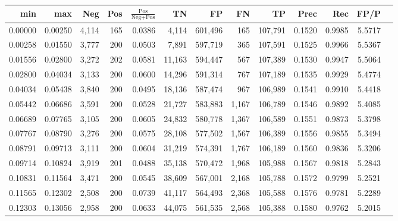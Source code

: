 \begin{tabular}{rrrrrrrrrrrrr}
\toprule
    min &     max &   Neg & Pos & $\frac{\text{Pos}}{\text{Neg}+\text{Pos}}$ &      TN &      FP &      FN &      TP &   Prec &    Rec &   FP/P \\
\midrule
0.00000 & 0.00250 & 4,114 & 165 &                                     0.0386 &   4,114 & 601,496 &     165 & 107,791 & 0.1520 & 0.9985 & 5.5717 \\
0.00258 & 0.01550 & 3,777 & 200 &                                     0.0503 &   7,891 & 597,719 &     365 & 107,591 & 0.1525 & 0.9966 & 5.5367 \\
0.01556 & 0.02800 & 3,272 & 202 &                                     0.0581 &  11,163 & 594,447 &     567 & 107,389 & 0.1530 & 0.9947 & 5.5064 \\
0.02800 & 0.04034 & 3,133 & 200 &                                     0.0600 &  14,296 & 591,314 &     767 & 107,189 & 0.1535 & 0.9929 & 5.4774 \\
0.04034 & 0.05438 & 3,840 & 200 &                                     0.0495 &  18,136 & 587,474 &     967 & 106,989 & 0.1541 & 0.9910 & 5.4418 \\
0.05442 & 0.06686 & 3,591 & 200 &                                     0.0528 &  21,727 & 583,883 &   1,167 & 106,789 & 0.1546 & 0.9892 & 5.4085 \\
0.06689 & 0.07765 & 3,105 & 200 &                                     0.0605 &  24,832 & 580,778 &   1,367 & 106,589 & 0.1551 & 0.9873 & 5.3798 \\
0.07767 & 0.08790 & 3,276 & 200 &                                     0.0575 &  28,108 & 577,502 &   1,567 & 106,389 & 0.1556 & 0.9855 & 5.3494 \\
0.08791 & 0.09713 & 3,111 & 200 &                                     0.0604 &  31,219 & 574,391 &   1,767 & 106,189 & 0.1560 & 0.9836 & 5.3206 \\
0.09714 & 0.10824 & 3,919 & 201 &                                     0.0488 &  35,138 & 570,472 &   1,968 & 105,988 & 0.1567 & 0.9818 & 5.2843 \\
0.10831 & 0.11564 & 3,471 & 200 &                                     0.0545 &  38,609 & 567,001 &   2,168 & 105,788 & 0.1572 & 0.9799 & 5.2521 \\
0.11565 & 0.12302 & 2,508 & 200 &                                     0.0739 &  41,117 & 564,493 &   2,368 & 105,588 & 0.1576 & 0.9781 & 5.2289 \\
0.12303 & 0.13056 & 2,958 & 200 &                                     0.0633 &  44,075 & 561,535 &   2,568 & 105,388 & 0.1580 & 0.9762 & 5.2015 \\

\end{tabular}
